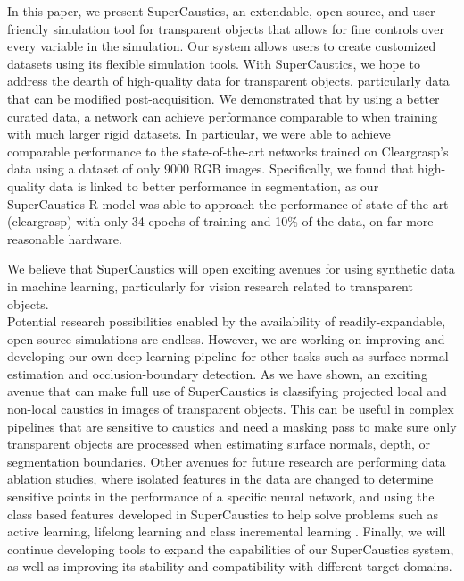 \documentclass[conference]{IEEEtran}
\begin{document}
In this paper, we present SuperCaustics, an extendable, open-source, and user-friendly simulation tool for transparent objects that allows for fine controls over every variable in the simulation. Our system allows users to create customized datasets using its flexible simulation tools. With SuperCaustics, we hope to address the dearth of high-quality data for transparent objects, particularly data that can be modified post-acquisition. We demonstrated that by using a better curated data, a network can achieve performance comparable to when training with much larger rigid datasets. In particular, we were able to achieve comparable performance to the state-of-the-art networks trained on Cleargrasp's data using a dataset of only 9000 RGB images. Specifically, we found that high-quality data is linked to better performance in segmentation, as our SuperCaustics-R model was able to approach the performance of state-of-the-art (cleargrasp) with only 34 epochs of training and 10\% of the data, on far more reasonable hardware.

We believe that SuperCaustics will open exciting avenues for using synthetic data in machine learning, particularly for vision research related to transparent objects.\\

Potential research possibilities enabled by the availability of readily-expandable, open-source simulations are endless. However, we are working on improving and developing our own deep learning pipeline for other tasks such as surface normal estimation and occlusion-boundary detection. As we have shown, an exciting avenue that can make full use of SuperCaustics is classifying projected local and non-local caustics in images of transparent objects. This can be useful in complex pipelines that are sensitive to caustics and need a masking pass to make sure only transparent objects are processed when estimating surface normals, depth, or segmentation boundaries. Other avenues for future research are performing data ablation studies, where isolated features in the data are changed to determine sensitive points in the performance of a specific neural network, and using the class based features developed in SuperCaustics to help solve problems such as active learning, lifelong learning and class incremental learning \cite{10.3389/frai.2020.00019,DJay,blake1,jay3}. Finally, we will continue developing tools to expand the capabilities of our SuperCaustics system, as well as improving its stability and compatibility with different target domains. 





\end{document}
